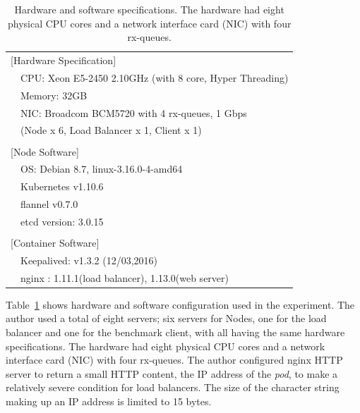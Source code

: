 {
\setlength{\tabcolsep}{2em}
\renewcommand{\arraystretch}{1.1}

\begin{table}[h]
  \centering
  \begin{tabular}{ll}
    \hline 
    \multicolumn{2}{l}{[Hardware Specification]}   \\
    & CPU: Xeon E5-2450 2.10GHz (with 8 core, Hyper Threading) \\
    & Memory: 32GB \\
    & NIC: Broadcom BCM5720 with 4 rx-queues, 1 Gbps \\
    & (Node x 6, Load Balancer x 1, Client x 1) \\
    & \\
    \multicolumn{2}{l}{[Node Software]}  \\
    & OS: Debian 8.7, linux-3.16.0-4-amd64 \\
    & Kubernetes v1.10.6 \\
    & flannel v0.7.0 \\
    & etcd version: 3.0.15 \\
    & \\
    \multicolumn{2}{l}{[Container Software]}   \\
    & Keepalived: v1.3.2 (12/03,2016) \\
    & nginx : 1.11.1(load balancer), 1.13.0(web server) \\
    \hline
  \end{tabular}

  \centering
  \begin{minipage}{0.9\columnwidth}
    \caption[Hardware and software specifications]{
      Hardware and software specifications.
      The hardware had eight physical CPU cores and a network interface card (NIC) with four rx-queues.
    }
    \label{tab:hw_machine_spec}
  \end{minipage}
\end{table}
}

Table~\ref{tab:hw_machine_spec} shows hardware and software configuration used in the experiment.
The author used a total of eight servers; six servers for Nodes, one for the load balancer and one for the benchmark client, with all having the same hardware specifications.
The hardware had eight physical CPU cores and a network interface card (NIC) with four rx-queues.
The author configured nginx HTTP server to return a small HTTP content, the IP address of the {\em pod}, to make a relatively severe condition for load balancers. 
The size of the character string making up an IP address is limited to 15 bytes.

